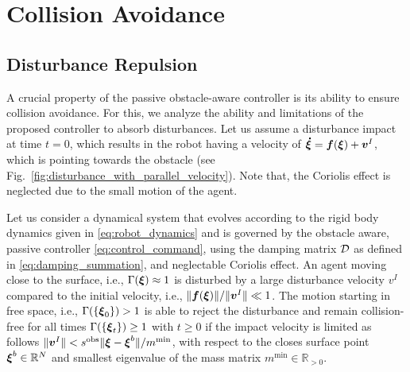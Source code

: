 \section{Collision Avoidance} \label{sec:collision_avoidance}

\subsection{Disturbance Repulsion}
A crucial property of the passive obstacle-aware controller is its ability to ensure collision avoidance. For this, we analyze the ability and limitations of the proposed controller to absorb disturbances.
Let us assume a disturbance impact at time $t=0$, which results in the robot having a velocity of $\boldsymbol{\dot \xi} = \boldsymbol{f}(\boldsymbol{\xi}) + \boldsymbol{v}^I$, which is pointing towards the obstacle (see Fig.~\ref{fig:disturbance_with_parallel_velocity}). 
Note that, the Coriolis effect is neglected due to the small motion of the agent.

\begin{lemma}
	Let us consider a dynamical system that evolves according to the rigid body dynamics given in \eqref{eq:robot_dynamics} and is governed by the obstacle aware, passive controller \eqref{eq:control_command}, using the damping matrix $\mathcal{D}$ as defined in \eqref{eq:damping_summation}, and neglectable Coriolis effect.
    An agent moving close to the surface, i.e., $\Gamma(\boldsymbol{\xi}) \approx 1$ is disturbed by a large disturbance velocity $v^I$ compared to the initial velocity, i.e., $\| \boldsymbol{f}(\boldsymbol{\xi}) \| / \|\boldsymbol{v}^I \| \ll 1 $.
	The motion starting in free space, i.e., $\Gamma( \{\boldsymbol{\xi}_0 \} ) > 1$ is able to reject the disturbance and remain collision-free for all times $\Gamma( \{\boldsymbol{\xi}_t\}) \geq 1$ with $t \geq 0$ if the impact velocity is limited as follows $\| \boldsymbol{v}^I \| < s^{\mathrm{obs}} \| \boldsymbol{\xi} - \boldsymbol{\xi}^b \| / m^{\mathrm{min}}$, with respect to the closes surface point $\boldsymbol{\xi}^b \in \mathbb{R}^N$ and smallest eigenvalue of the mass matrix $m^{\mathrm{min}} \in \mathbb{R}_{>0}$.
\end{lemma}


